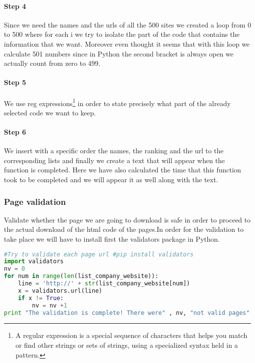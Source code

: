 \documentclass{article}
\begin{document}
\paragraph{Step 4} Since we need the names and the urls of all the 500 sites we created a loop from 0 to 500 where for each i we try to isolate the part of the code that contains the information that we want. Moreover even thought it seems that with this loop we calculate 501 numbers since in Python the second bracket is always open we actually count from zero to 499.
\paragraph{Step 5} We use reg expressions\footnote{A regular expression is a special sequence of characters that helps you match or find other strings or sets of strings, using a specialized syntax held in a pattern.} in order to state precisely what part of the already selected code we want to keep.
\paragraph{Step 6} We insert with a specific order the names, the ranking and the url to the corresponding lists and finally we create a text that will appear when the function is completed. Here we have also calculated the time that this function took to be completed and we will appear it as well along with the text.
\subsubsection{Page validation}
Validate whether the page we are going to download is safe in order to proceed to the actual download of the html code of the pages.In order for the validation to take place we will have to install first the validators package in Python.
\begin{lstlisting}[language=Python]
#Try to validate each page url #pip install validators
import validators
nv = 0
for num in range(len(list_company_website)):
    line = 'http://' + str(list_company_website[num])
    x = validators.url(line)    
    if x != True:
        nv = nv +1
print "The validation is complete! There were" , nv, "not valid pages"
\end{lstlisting}
\end{document}
